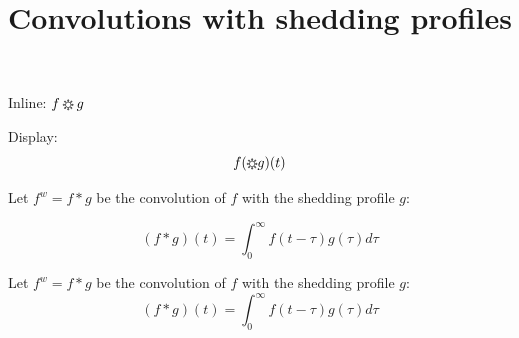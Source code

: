 \documentclass{article}
\title{Convolutions with shedding profiles}
\begin{document}
Inline: \( f \conv g \)

Display:
\[
  f (\conv g)(t)
\]


Let $f^w = f * g$ be the convolution of $f$ with the shedding profile $g$:

\[
  (f * g)(t) = \int_0^\infty f(t-\tau) g(\tau)d\tau
\]

\EnableCoronaAsterisk

Let $f^w = f * g$ be the convolution of $f$ with the shedding profile $g$:
\[
  (f * g)(t) = \int_0^\infty f(t-\tau) g(\tau)d\tau
\]


\DisableCoronaAsterisk
\end{document}
